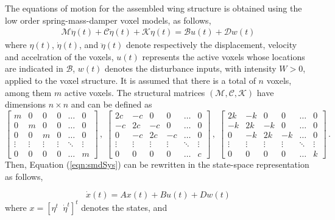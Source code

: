 \documentclass[11pt]{ucthesis}
\begin{document}
The equations of motion for the assembled wing structure is obtained using the low order spring-mass-damper voxel models, as follows,
\begin{equation}
\begin{array}{l}
\mathcal{M} \ddot{\eta}(t) + \mathcal{C} \dot{\eta}(t) + \mathcal{K} \eta(t) = \mathcal{B} u(t) + \mathcal{D} w(t)
\end{array}
\label{eqn:smdSys}
\end{equation}
where $\eta (t)$, $\dot{\eta} (t)$, and $\ddot{\eta} (t)$ denote respectively the displacement, velocity and accelration of the voxels, $u (t)$ represents the active voxels whose locations are indicated in $\mathcal{B}$, $w (t)$ denotes the disturbance inputs, with intensity $W >0$, applied to the voxel structure. It is assumed that there is a total of $n$ voxels, among them $m$ active voxels. The structural matrices $(\mathcal{M}, \mathcal{C}, \mathcal{K})$ have dimensions $n \times n$ and can be defined as
\begin{equation}
\begin{bmatrix}m&0&0&0&\dots&0\\0&m&0&0&\dots&0\\0&0&m&0&\dots&0\\\vdots&\vdots&\vdots&\vdots&\ddots&\vdots \\0&0&0&0&\dots&m\end{bmatrix} \,,\;
\begin{bmatrix}2c&-c&0&0&\dots&0\\-c&2c&- c&0&\dots&0\\0&-c&2c&-c&\dots&0\\ \vdots&\vdots&\vdots&\vdots&\ddots&\vdots \\0&0&0&0&\dots&c\end{bmatrix} \,,\;
\begin{bmatrix}2k&-k&0&0&\dots&0\\-k&2k&-k&0&\dots&0\\0&-k&2k&-k&\dots&0\\ \vdots&\vdots&\vdots&\vdots&\ddots&\vdots \\0&0&0&0&\dots&k\end{bmatrix} \,.
\label{eqn:EOS}
\end{equation}
Then, Equation (\ref{eqn:smdSys}) can be rewritten in the state-space representation as follows,

\begin{equation}
\dot{x} (t) = A x(t) + B u(t) + D w(t)
\label{sigma1}
\end{equation}
where $x = [\eta^t \;\; \dot{\eta}^t]^t$ denotes the states, and
\end{document}
